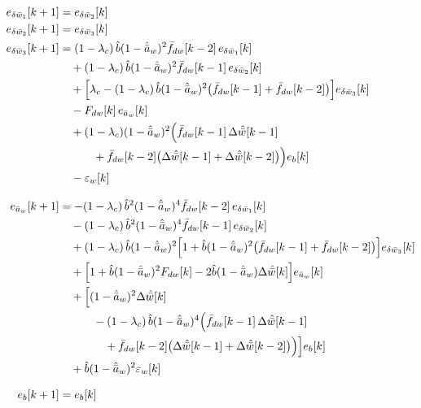 \documentclass[11pt,a4paper,fontset=none]{ctexart}
\newcommand{\ba}{\bar{a}}
\newcommand{\bw}{\bar{w}}
\newcommand{\dWh}{\Delta\hat{\bw}}
\newcommand{\ah}{\hat{\ba}_w}
\newcommand{\bh}{\hat{b}}
\newcommand{\fd}{\bar f_{dw}}
\newcommand{\ea}{e_{\ba_w}}
\begin{document}
\begin{align*}
e_{\delta\bw_1}[k+1] &= e_{\delta\bw_2}[k] \\
e_{\delta\bw_2}[k+1] &= e_{\delta\bw_3}[k] \\
e_{\delta\bw_3}[k+1] &= (1-\lambda_c)\,\bh(1-\ah)^{2}\fd[k-2]\,e_{\delta\bw_1}[k] \\
  &\quad + (1-\lambda_c)\,\bh(1-\ah)^{2}\fd[k-1]\,e_{\delta\bw_2}[k] \\
  &\quad + \Bigl[\lambda_c - (1-\lambda_c)\,\bh(1-\ah)^{2}\bigl(\fd[k-1] + \fd[k-2]\bigr)\Bigr]e_{\delta\bw_3}[k] \\
  &\quad - F_{dw}[k]\,\ea[k] \\
  &\quad + (1-\lambda_c)(1-\ah)^{2}\Bigl(\fd[k-1]\,\dWh[k-1] \\
  &\qquad\quad + \fd[k-2]\bigl(\dWh[k-1] + \dWh[k-2]\bigr)\Bigr)e_b[k] \\
  &\quad - \varepsilon_w[k] \\[8pt]
\ea[k+1] &= -(1-\lambda_c)\,\bh^{2}(1-\ah)^{4}\fd[k-2]\,e_{\delta\bw_1}[k] \\
  &\quad - (1-\lambda_c)\,\bh^{2}(1-\ah)^{4}\fd[k-1]\,e_{\delta\bw_2}[k] \\
  &\quad + (1-\lambda_c)\,\bh(1-\ah)^{2}\Bigl[1 + \bh(1-\ah)^{2}\bigl(\fd[k-1] + \fd[k-2]\bigr)\Bigr]e_{\delta\bw_3}[k] \\
  &\quad + \Bigl[1 + \bh(1-\ah)^{2}F_{dw}[k] - 2\bh(1-\ah)\dWh[k]\Bigr]\ea[k] \\
  &\quad + \Bigl[(1-\ah)^{2}\dWh[k] \\
  &\qquad\quad - (1-\lambda_c)\,\bh(1-\ah)^{4}\Bigl(\fd[k-1]\,\dWh[k-1] \\
  &\qquad\qquad + \fd[k-2]\bigl(\dWh[k-1] + \dWh[k-2]\bigr)\Bigr)\Bigr]e_b[k] \\
  &\quad + \bh(1-\ah)^{2}\varepsilon_w[k] \\[8pt]
e_b[k+1] &= e_b[k]
\end{align*}
\end{document}
